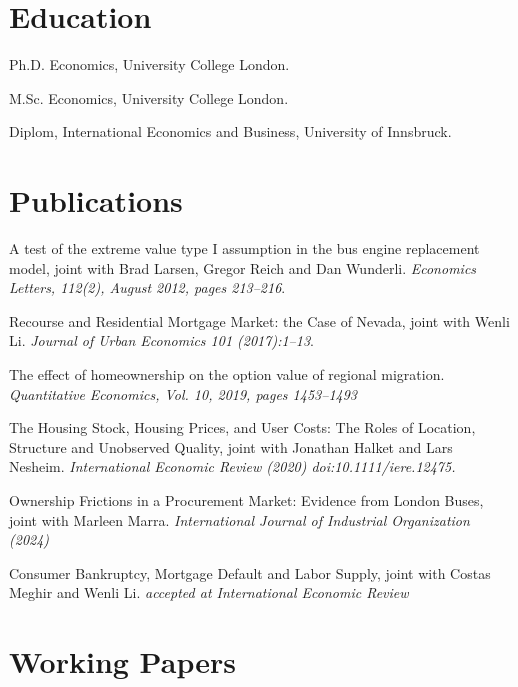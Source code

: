 \documentclass[letterpaper]{article}
\renewenvironment{itemize}{
  \begin{list}{}{
    \setlength{\leftmargin}{1.5em}
  }
}{
  \end{list}
}
\begin{document}
\section*{Education}

\begin{itemize}
  \setlength{\itemindent}{26pt}
  \item[2015:] Ph.D. Economics, University College London.
   
  \item[2008:] M.Sc. Economics, University College London.

  \item[2006:] Diplom, International Economics and Business, University of Innsbruck.

\end{itemize}


\section*{Publications}

\begin{itemize}
\item A test of the extreme value type I assumption in the bus engine replacement model, joint with Brad Larsen, Gregor Reich and Dan Wunderli. {\it Economics Letters, 112(2), August 2012, pages 213--216}.
\item Recourse and Residential Mortgage Market: the Case of Nevada, joint with Wenli Li. {\it Journal of Urban Economics 101 (2017):1–13}.
\item The effect of homeownership on the option value of regional migration. {\it Quantitative Economics, Vol. 10, 2019, pages 1453--1493}
\item The Housing Stock, Housing Prices, and User Costs: The Roles of Location, Structure and Unobserved Quality, joint with Jonathan Halket and Lars Nesheim. {\it International Economic Review (2020) doi:10.1111/iere.12475.}
\item Ownership Frictions in a Procurement Market: Evidence from London Buses, joint with Marleen Marra. {\it International Journal of Industrial Organization (2024)}

\item Consumer Bankruptcy, Mortgage Default and Labor Supply, joint with Costas Meghir and Wenli Li. {\it accepted at International Economic Review}
\end{itemize}


\section*{Working Papers}
\end{document}
